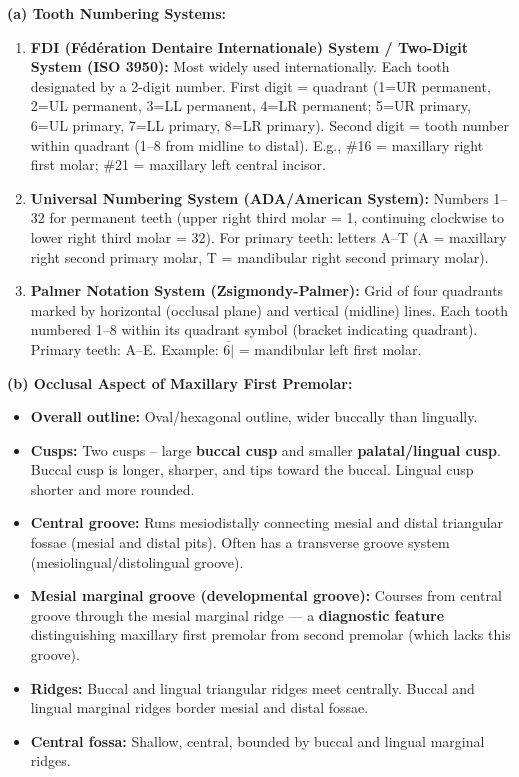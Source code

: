 \documentclass[11pt,a4paper]{article}
\begin{document}
\begin{ansbox}
\textbf{(a) Tooth Numbering Systems:}

\begin{enumerate}[leftmargin=*]
    \item \textbf{FDI (Fédération Dentaire Internationale) System / Two-Digit System (ISO 3950):} Most widely used internationally. Each tooth designated by a 2-digit number. First digit = quadrant (1=UR permanent, 2=UL permanent, 3=LL permanent, 4=LR permanent; 5=UR primary, 6=UL primary, 7=LL primary, 8=LR primary). Second digit = tooth number within quadrant (1--8 from midline to distal). E.g., \#16 = maxillary right first molar; \#21 = maxillary left central incisor.
    \item \textbf{Universal Numbering System (ADA/American System):} Numbers 1--32 for permanent teeth (upper right third molar = 1, continuing clockwise to lower right third molar = 32). For primary teeth: letters A--T (A = maxillary right second primary molar, T = mandibular right second primary molar).
    \item \textbf{Palmer Notation System (Zsigmondy-Palmer):} Grid of four quadrants marked by horizontal (occlusal plane) and vertical (midline) lines. Each tooth numbered 1--8 within its quadrant symbol (bracket indicating quadrant). Primary teeth: A--E. Example: $\overline{6|}$ = mandibular left first molar.
\end{enumerate}

\textbf{(b) Occlusal Aspect of Maxillary First Premolar:}
\begin{itemize}[leftmargin=*]
    \item \textbf{Overall outline:} Oval/hexagonal outline, wider buccally than lingually.
    \item \textbf{Cusps:} Two cusps -- large \textbf{buccal cusp} and smaller \textbf{palatal/lingual cusp}. Buccal cusp is longer, sharper, and tips toward the buccal. Lingual cusp shorter and more rounded.
    \item \textbf{Central groove:} Runs mesiodistally connecting mesial and distal triangular fossae (mesial and distal pits). Often has a transverse groove system (mesiolingual/distolingual groove).
    \item \textbf{Mesial marginal groove (developmental groove):} Courses from central groove through the mesial marginal ridge --- a \textbf{diagnostic feature} distinguishing maxillary first premolar from second premolar (which lacks this groove).
    \item \textbf{Ridges:} Buccal and lingual triangular ridges meet centrally. Buccal and lingual marginal ridges border mesial and distal fossae.
    \item \textbf{Central fossa:} Shallow, central, bounded by buccal and lingual marginal ridges.
\end{itemize}


\end{ansbox}
\end{document}
